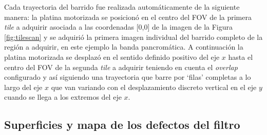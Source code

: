 Cada trayectoria del barrido fue realizada automáticamente de la siguiente manera: la platina motorizada se posicionó en el centro del FOV de la primera \textit{tile} a adquirir asociada a las coordenadas [0,0] de la imagen de la Figura \ref{fig:tilescan} y se adquirió la primera imagen individual del barrido completo de la región a adquirir, en este ejemplo la banda pancromática. A continuación la platina motorizada se desplazó en el sentido definido positivo del eje $x$ hasta el centro del FOV de la segunda \textit{tile} a adquirir teniendo en cuenta el \textit{overlap} configurado y así siguiendo una trayectoria que barre por `filas' completas a lo largo del eje $\textit{x}$ que van variando con el desplazamiento discreto vertical en el eje $\textit{y}$ cuando se llega a los extremos del eje $\textit{x}$.

\singlespacing
\subsection{Superficies y mapa de los defectos del filtro}
\label{subs:compl}

